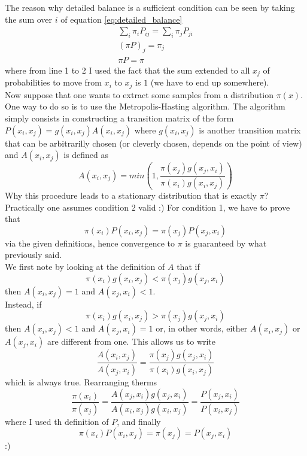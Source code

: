\documentclass{article}
\begin{document}
    The reason why detailed balance is a sufficient condition can be seen by taking the sum over $i$ of equation \ref{eq:detailed_balance}
    \begin{gather*}
        \sum_i \pi_i P_{ij} = \sum_i \pi_j P_{ji} \\
        (\pi P)_j = \pi_j \\
        \pi P = \pi
    \end{gather*}
    where from line 1 to 2 I used the fact that the sum extended to all $x_j$ of probabilities to move from $x_i$ to $x_j$ is $1$ (we have to end up somewhere). \\
    Now suppose that one wants to extract some samples from a distribution $\pi(x)$. One way to do so is to use the Metropolis-Hasting algorithm. 
    The algorithm simply consists in constructing a transition matrix of the form $P(x_i, x_j) = g(x_i, x_j)A(x_i, x_j)$ where $g(x_i, x_j)$ is another transition
    matrix that can be arbitrarilly chosen (or cleverly chosen, depends on the point of view) and $A(x_i, x_j)$ is defined as 
    $$A(x_i, x_j) = min\left(1, \frac{\pi(x_j)g(x_j, x_i)}{\pi(x_i)g(x_i,x_j)}\right)$$
    Why this procedure leads to a stationary distribution that is exactly $\pi$? Practically one assumes condition $2$ valid :) For condition 1, we have to prove that 
    $$\pi(x_i) P(x_i,x_j) = \pi(x_j) P(x_j,x_i)$$
    via the given definitions, hence convergence to $\pi$ is guaranteed by what previously said. \\
    We first note by looking at the definition of $A$ that if 
    $$\pi(x_i)g(x_i, x_j) < \pi(x_j)g(x_j,x_i)$$ then 
    $A(x_i, x_j) = 1$ and $A(x_j, x_i) < 1$. \\
    Instead, if 
    $$\pi(x_i)g(x_i, x_j) > \pi(x_j)g(x_j,x_i)$$ then
    $A(x_i, x_j) < 1$ and $A(x_j, x_i) = 1$
    or, in other words, either $A(x_i, x_j)$ or $A(x_j, x_i)$ are different from one. This allows us to write
    $$\frac{A(x_i,x_j)}{A(x_j, x_i)} = \frac{\pi(x_j) g(x_j,x_i)}{\pi(x_i) g(x_i,x_j)}$$
    which is always true. Rearranging therms 
    $$\frac{\pi(x_i)}{\pi(x_j)} = \frac{A(x_j, x_i)g(x_j, x_i)}{A(x_i, x_j)g(x_i, x_j)} = \frac{P(x_j, x_i)}{P(x_i, x_j)}$$
    where I used th definition of $P$, and finally
    $$ \pi(x_i)P(x_i, x_j) = \pi(x_j) = P(x_j, x_i)$$
    :)
\end{document}
